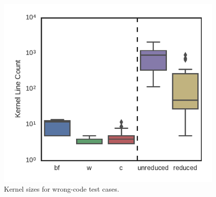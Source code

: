 \begin{figure}
  \centering %
    \includegraphics[width=\columnwidth]{build/img/kernel-sizes}%
  \caption{%
  	Kernel sizes for wrong-code test cases. %
  }%
  \label{fig:kernel-sizes} %
\end{figure}
